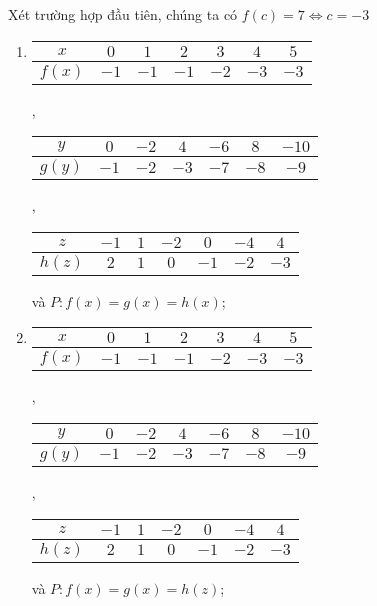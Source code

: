 Xét trường hợp đầu tiên, chúng ta có $f(c) = 7 \iff c = -3$

\exercise[ex:hpt1]
\begin{enumerate}
   \item 
   \begin{tabular}{|c|c|c|c|c|c|c|}
      \hline
      $x$ & $0$ & $1$ & $2$ & $3$ & $4$ & $5$ \\
      \hline
      $f(x)$ & $-1$ & $-1$ & $-1$ & $-2$ & $-3$ & $-3$\\
      \hline
   \end{tabular},
   \begin{tabular}{|c|c|c|c|c|c|c|}
      \hline
      $y$ & $0$ & $-2$ & $4$ & $-6$ & $8$ & $-10$\\
      \hline
      $g(y)$ & $-1$ & $-2$ & $-3$ & $-7$ & $-8$ & $-9$\\
      \hline
   \end{tabular},

   \noindent\begin{tabular}{|c|c|c|c|c|c|c|}
      \hline
      $z$ & $-1$ & $1$ & $-2$ & $0$ & $-4$ & $4$\\
      \hline
      $h(z)$ & $2$ & $1$ & $0$ & $-1$ & $-2$ & $-3$\\
      \hline
   \end{tabular} và $P:f(x) = g(x) = h(x)$;

   \item
   \begin{tabular}{|c|c|c|c|c|c|c|}
      \hline
      $x$ & $0$ & $1$ & $2$ & $3$ & $4$ & $5$ \\
      \hline
      $f(x)$ & $-1$ & $-1$ & $-1$ & $-2$ & $-3$ & $-3$\\
      \hline
   \end{tabular},
   \begin{tabular}{|c|c|c|c|c|c|c|}
      \hline
      $y$ & $0$ & $-2$ & $4$ & $-6$ & $8$ & $-10$\\
      \hline
      $g(y)$ & $-1$ & $-2$ & $-3$ & $-7$ & $-8$ & $-9$\\
      \hline
   \end{tabular},

   \noindent\begin{tabular}{|c|c|c|c|c|c|c|}
      \hline
      $z$ & $-1$ & $1$ & $-2$ & $0$ & $-4$ & $4$\\
      \hline
      $h(z)$ & $2$ & $1$ & $0$ & $-1$ & $-2$ & $-3$\\
      \hline
   \end{tabular} và $P:f(x) = g(x) = h(z)$;


\end{enumerate}
